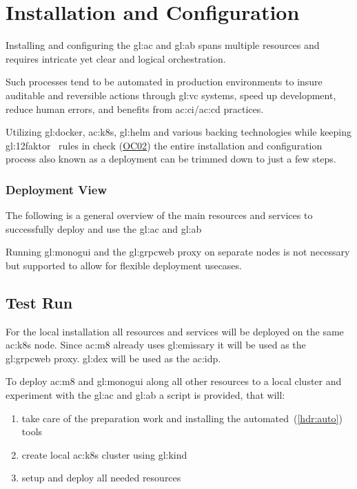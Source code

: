 %
\chapter{Installation and Configuration}

Installing and configuring the \gls{gl:ac} and \gls{gl:ab} spans multiple resources and requires intricate yet clear and logical orchestration.

Such processes tend to be automated in production environments to insure auditable and reversible actions through \gls{gl:vc} systems, speed up development, reduce human errors, and benefits from \gls{ac:ci}/\gls{ac:cd} practices.

Utilizing \gls{gl:docker}, \gls{ac:k8s}, \gls{gl:helm} and various backing technologies while keeping \gls{gl:12faktor}~\citep{TheTwelv47} rules in check (\hyperref[oc:ac02]{OC02}) the entire installation and configuration process also known as a deployment can be trimmed down to just a few steps.

\subsection{Deployment View}

The following is a general overview of the main resources and services to successfully deploy and use the \gls{gl:ac} and \gls{gl:ab} 


Running \gls{gl:monogui} and the \gls{gl:grpcweb} proxy on separate nodes is not necessary but supported to allow for flexible deployment usecases.

\section{Test Run}

For the local installation all resources and services will be deployed on the same \gls{ac:k8s} node. Since \gls{ac:m8} already uses \gls{gl:emissary} it will be used as the \gls{gl:grpcweb} proxy. \Gls{gl:dex} will be used as the \gls{ac:idp}.

To deploy \gls{ac:m8} and \gls{gl:monogui} along all other resources to a local cluster and experiment with the \gls{gl:ac} and \gls{gl:ab} a script is provided, that will:

\begin{enumerate}
  \item take care of the preparation work and installing the automated~(\ref{hdr:auto}) tools
  \item create local \gls{ac:k8s} cluster using \gls{gl:kind}
  \item setup and deploy all needed resources
\end{enumerate}

